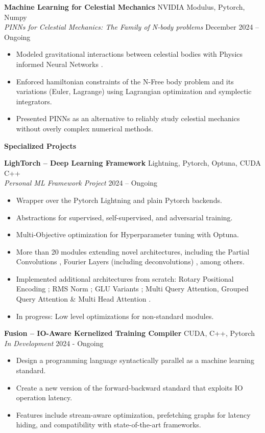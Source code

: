 \documentclass[11pt]{article}
\begin{document}
\textbf{Machine Learning for Celestial Mechanics} \hfill NVIDIA Modulus, Pytorch, Numpy \\
\textit{PINNs for Celestial Mechanics: The Family of N-body problems} \hfill December 2024 – Ongoing
\begin{itemize}[noitemsep]
    \item Modeled gravitational interactions between celestial bodies with Physics informed Neural Networks \cite{pinn}.
    \item Enforced hamiltonian constraints of the N-Free body problem and its variations (Euler, Lagrange) using Lagrangian optimization and symplectic integrators.
    \item Presented PINNs as an alternative to reliably study celestial mechanics without overly complex numerical methods.
\end{itemize}

\begin{center}
    \textbf{Specialized Projects}
\end{center}

\textbf{LighTorch – Deep Learning Framework} \hfill Lightning, Pytorch, Optuna, CUDA C++ \\
\textit{Personal ML Framework Project} \hfill 2024 – Ongoing
\begin{itemize}[noitemsep]
    \item Wrapper over the Pytorch Lightning and plain Pytorch backends.
    \item Abstractions for supervised, self-supervised, and adversarial training.
    \item Multi-Objective optimization for Hyperparameter tuning with Optuna.
    \item More than 20 modules extending novel architectures, including the Partial Convolutions \cite{conv}, Fourier Layers (including deconvolutions) \cite{fourier}, among others.
    \item Implemented additional architectures from scratch: Rotary Positional Encoding \cite{pe}; RMS Norm \cite{norm}; GLU Variants \cite{ffw}; Multi Query Attention, Grouped Query Attention \& Multi Head Attention \cite{attention}.
    \item In progress: Low level optimizations for non-standard modules.
\end{itemize}

\textbf{Fusion – IO-Aware Kernelized Training Compiler} \hfill CUDA, C++, Pytorch\\
\textit{In Development} \hfill 2024 - Ongoing
\begin{itemize}[noitemsep]
    \item Design a programming language syntactically parallel as a machine learning standard.
    \item Create a new version of the forward-backward standard that exploits IO operation latency.
    \item Features include stream-aware optimization, prefetching graphs for latency hiding, and compatibility with state-of-the-art frameworks.
\end{itemize}
\end{document}
